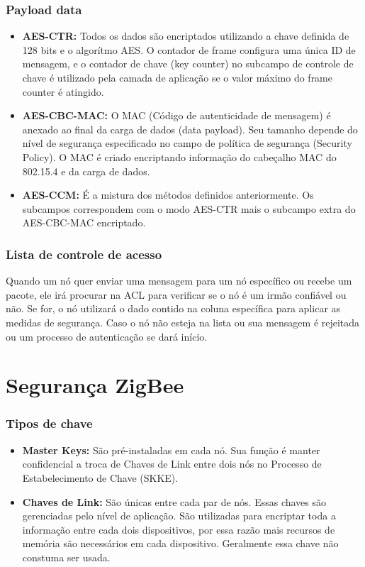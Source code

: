 \documentclass{beamer}
\begin{document}
  \frame
  {
    \frametitle{Payload data}
    \begin{itemize}
      \item \textbf{AES-CTR:} Todos os dados são encriptados utilizando a chave definida de 128 bits
	      e o algorítmo AES. O contador de frame configura uma única ID de mensagem, e o
	      contador de chave (key counter) no subcampo de controle de chave é utilizado pela
	      camada de aplicação se o valor máximo do frame counter é atingido.
      \item \textbf{AES-CBC-MAC:} O MAC (Código de autenticidade de mensagem) é anexado ao
	      final da carga de dados (data payload). Seu tamanho depende do nível de segurança
	      especificado no campo de política de segurança (Security Policy). O MAC é criado
	      encriptando informação do cabeçalho MAC do 802.15.4 e da carga de dados.
      \item \textbf{AES-CCM:} É a mistura dos métodos definidos anteriormente. Os subcampos correspondem
	      com o modo AES-CTR mais o subcampo extra do AES-CBC-MAC encriptado.
    \end{itemize}  
  }

  \frame
  {
    \frametitle{Lista de controle de acesso}
    Quando um nó quer enviar uma mensagem para um nó específico ou recebe um pacote,
    ele irá procurar na ACL para verificar se o nó é um irmão confiável ou não. Se for, o nó
    utilizará o dado contido na coluna específica para aplicar as medidas de segurança. Caso
    o nó não esteja na lista ou sua mensagem é rejeitada ou um processo de autenticação se
    dará início.  
  }

  \section{Segurança ZigBee}
  \frame
  {
    \frametitle{Tipos de chave}
      \begin{itemize}
       \item \textbf{Master Keys:} São pré-instaladas em cada nó. Sua função é manter confidencial
	  a troca de Chaves de Link entre dois nós no Processo de Estabelecimento de
	  Chave (SKKE).
	\item \textbf{Chaves de Link:} São únicas entre cada par de nós. Essas chaves são gerenciadas
	  pelo nível de aplicação. São utilizadas para encriptar toda a informação entre cada
	  dois dispositivos, por essa razão mais recursos de memória são necessários em cada
	  dispositivo. Geralmente essa chave não constuma ser usada.
      \end{itemize}
  }
\end{document}
